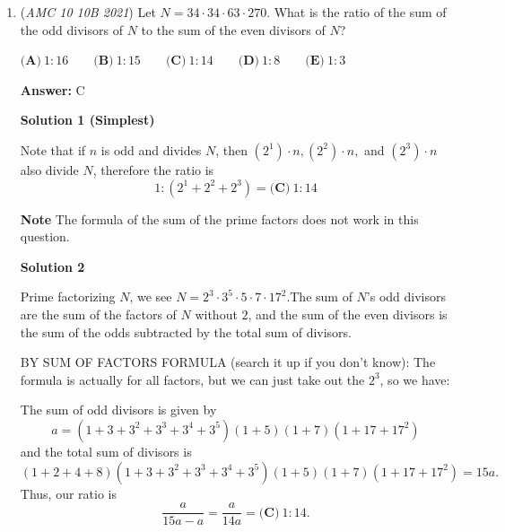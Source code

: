 \begin{enumerate}
\textbf{Solution 3 (rational function)}

Let the \textbf{interior} of the pan have $n$ vertical cuts and $m$ horizontal cuts. We see that $mn = 2(m + n) + 4$. We want the greatest possible value of $(m+2)(n+2) = 2mn.$ Expanding the first equation we get 
 \[mn = 2m + 2n + 4 \implies (m-2)n = 2m + 4 \implies n = \frac{2m + 4}{m - 2}.\] In the first quadrant, this is a rational function which decreases as $m$ approaches infinity. So we want the smallest value for $m$ for the largest value of $n$. We know $m \geq 3$. If $m = 3, n = 10.$ And we know since the function only decreases from here, these must be the greatest possible values. So the answer is $2mn = 2\cdot 30 = \boxed{60}.$

 Note: the problem where this is linked is covered 1:45-2:50

 


	\item (\textit{AMC 10 10B 2021}) Let $N = 34 \cdot 34 \cdot 63 \cdot 270$. What is the ratio of the sum of the odd divisors of $N$ to the sum of the even divisors of $N$?


 $\textbf{(A)} ~1 : 16 \qquad\textbf{(B)} ~1 : 15 \qquad\textbf{(C)} ~1 : 14 \qquad\textbf{(D)} ~1 : 8 \qquad\textbf{(E)} ~1 : 3$

 \textbf{Answer: }C



\textbf{Solution 1 (Simplest)}

Note that if $n$ is odd and divides $N$, then $(2^1)\cdot n, (2^2)\cdot n,$ and $(2^3)\cdot n$ also divide $N$, therefore the ratio is 
 \[1:(2^1+2^2+2^3)=\boxed{\textbf{(C)} ~1 : 14}\]

 \textbf{Note} The formula of the sum of the prime factors does not work in this question.

 



\textbf{Solution 2}

Prime factorizing $N$, we see $N=2^{3} \cdot 3^{5} \cdot 5\cdot 7\cdot 17^{2}$.The sum of $N$'s odd divisors are the sum of the factors of $N$ without $2$, and the sum of the even divisors is the sum of the odds subtracted by the total sum of divisors. 

 BY SUM OF FACTORS FORMULA (search it up if you don't know): The formula is actually for all factors, but we can just take out the $2^3$, so we have:

 The sum of odd divisors is given by 
 \[a = (1+3+3^2 + 3^3 + 3^4 + 3^5)(1 + 5)(1+7)(1+17+17^2)\] and the total sum of divisors is 
 \[(1+2+4+8)(1+3+3^2 + 3^3 + 3^4 + 3^5)(1 + 5)(1+7)(1+17+17^2) = 15a.\] Thus, our ratio is 
 \[\frac{a}{15a-a} = \frac{a}{14a} = \boxed{\textbf{(C)} ~1 : 14}.\]





\end{enumerate}
